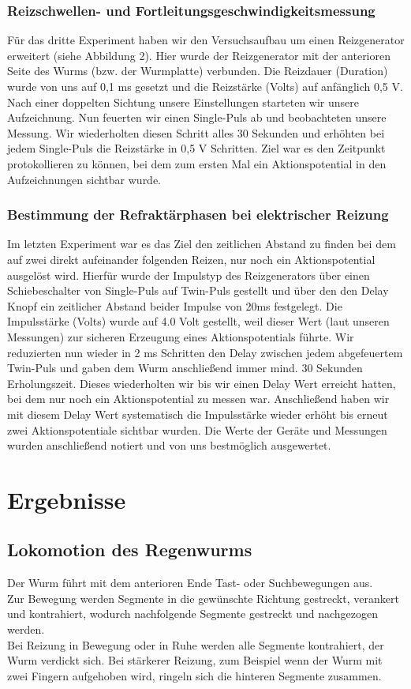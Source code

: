 \documentclass[a4paper]{article}
\begin{document}
\subsubsection{Reizschwellen- und Fortleitungsgeschwindigkeitsmessung}
Für das dritte Experiment haben wir den Versuchsaufbau um einen Reizgenerator erweitert (siehe Abbildung 2). Hier wurde der Reizgenerator mit der anterioren Seite des Wurms (bzw. der Wurmplatte) verbunden. Die Reizdauer (Duration) wurde von uns auf 0,1 ms gesetzt und die Reizstärke (Volts) auf anfänglich 0,5 V. Nach einer doppelten Sichtung unsere Einstellungen starteten wir unsere Aufzeichnung. Nun feuerten wir einen Single-Puls ab und beobachteten unsere Messung. Wir wiederholten diesen Schritt alles 30 Sekunden und erhöhten bei jedem Single-Puls die Reizstärke in 0,5 V Schritten. Ziel war es den Zeitpunkt protokollieren zu können, bei dem zum ersten Mal ein Aktionspotential in den Aufzeichnungen sichtbar wurde.
\subsubsection{Bestimmung der Refraktärphasen bei elektrischer Reizung}
Im letzten Experiment war es das Ziel den zeitlichen Abstand zu finden bei dem auf zwei direkt aufeinander folgenden Reizen, nur noch ein Aktionspotential ausgelöst wird. Hierfür wurde der Impulstyp des Reizgenerators über einen Schiebeschalter von Single-Puls auf Twin-Puls gestellt und über den den Delay Knopf ein zeitlicher Abstand beider Impulse von 20ms festgelegt. Die Impulsstärke (Volts) wurde auf 4.0 Volt gestellt, weil dieser Wert (laut unseren Messungen) zur sicheren Erzeugung eines Aktionspotentials führte. Wir reduzierten nun wieder in 2 ms Schritten den Delay zwischen jedem abgefeuertem Twin-Puls und gaben dem Wurm anschließend immer mind. 30 Sekunden Erholungszeit. Dieses wiederholten wir bis wir einen Delay Wert erreicht hatten, bei dem nur noch ein Aktionspotential zu messen war. Anschließend haben wir mit diesem Delay Wert systematisch die Impulsstärke wieder erhöht bis erneut zwei Aktionspotentiale sichtbar wurden. Die Werte der Geräte und Messungen wurden anschließend notiert und von uns bestmöglich ausgewertet.

\newpage
\section{Ergebnisse}

\subsection{Lokomotion des Regenwurms}
Der Wurm führt mit dem anterioren Ende Tast- oder Suchbewegungen aus. \\
Zur Bewegung werden Segmente in die gewünschte Richtung gestreckt, verankert und kontrahiert, wodurch nachfolgende Segmente gestreckt und nachgezogen werden.\\
Bei Reizung in Bewegung oder in Ruhe werden alle Segmente kontrahiert, der Wurm verdickt sich. Bei stärkerer Reizung, zum Beispiel wenn der Wurm mit zwei Fingern aufgehoben wird, ringeln sich die hinteren Segmente zusammen.
\end{document}
